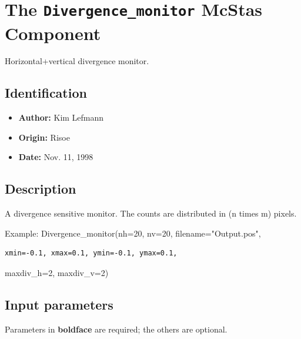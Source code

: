 \section{The \texttt{Divergence\_monitor} McStas Component}
Horizontal+vertical divergence monitor.

\subsection*{Identification}
\begin{itemize}
  \item \textbf{Author:} Kim Lefmann
  \item \textbf{Origin:} Risoe
  \item \textbf{Date:} Nov. 11, 1998
\end{itemize}

\subsection*{Description}
A divergence sensitive monitor. The counts are distributed in (n times m) pixels.

Example: Divergence\_monitor(nh=20, nv=20, filename="Output.pos",

\begin{verbatim}
xmin=-0.1, xmax=0.1, ymin=-0.1, ymax=0.1,
\end{verbatim}

maxdiv\_h=2, maxdiv\_v=2)

\subsection*{Input parameters}
Parameters in \textbf{boldface} are required; the others are optional.

